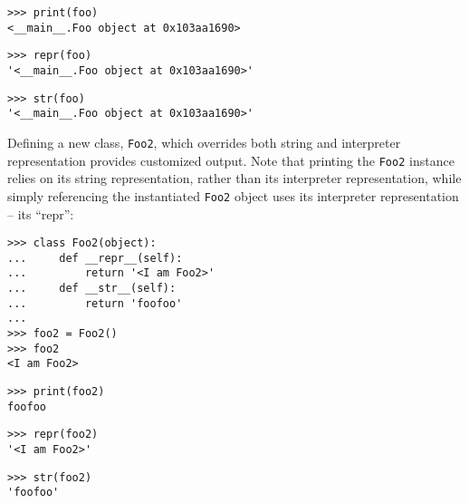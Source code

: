 \begin{comment}
<abjad>
print(foo)
repr(foo)
str(foo)
</abjad>
\end{comment}

\begin{abjadbookoutput}
\begin{singlespacing}
\vspace{-0.5\baselineskip}
\begin{lstlisting}
>>> print(foo)
<__main__.Foo object at 0x103aa1690>
\end{lstlisting}
\begin{lstlisting}
>>> repr(foo)
'<__main__.Foo object at 0x103aa1690>'
\end{lstlisting}
\begin{lstlisting}
>>> str(foo)
'<__main__.Foo object at 0x103aa1690>'
\end{lstlisting}
\end{singlespacing}
\end{abjadbookoutput}

\noindent Defining a new class, \texttt{Foo2}, which overrides both string and
interpreter representation provides customized output. Note that printing the
\texttt{Foo2} instance relies on its string representation, rather than its
interpreter representation, while simply referencing the instantiated
\texttt{Foo2} object uses its interpreter representation -- its \enquote{repr}:

\begin{comment}
<abjad>
class Foo2(object):
    def __repr__(self):
        return '<I am Foo2>'
    def __str__(self):
        return 'foofoo'

foo2 = Foo2()
foo2
print(foo2)
repr(foo2)
str(foo2)
</abjad>
\end{comment}

\begin{abjadbookoutput}
\begin{singlespacing}
\vspace{-0.5\baselineskip}
\begin{lstlisting}
>>> class Foo2(object):
...     def __repr__(self):
...         return '<I am Foo2>'
...     def __str__(self):
...         return 'foofoo'
...
>>> foo2 = Foo2()
>>> foo2
<I am Foo2>
\end{lstlisting}
\begin{lstlisting}
>>> print(foo2)
foofoo
\end{lstlisting}
\begin{lstlisting}
>>> repr(foo2)
'<I am Foo2>'
\end{lstlisting}
\begin{lstlisting}
>>> str(foo2)
'foofoo'
\end{lstlisting}
\end{singlespacing}
\end{abjadbookoutput}

